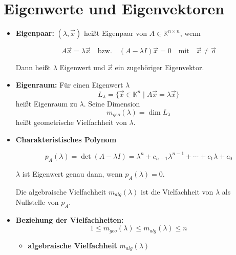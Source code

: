 \documentclass[a4paper,11pt,oneside,open=any,parskip=half, DIV=15]{scrreprt}
\begin{document}
\section{Eigenwerte und Eigenvektoren}

   \begin{itemize}
      \item \textbf{Eigenpaar:} \((\lambda, \vec{x})\) heißt Eigenpaar von \(A \in \mathbb{K}^{n \times n}\), wenn

      \begin{importantbox}
         \[
            A \vec{x} = \lambda \vec{x} \quad \text{bzw.} \quad (A - \lambda I)\vec{x} = 0 \quad \text{mit} \quad \vec x \neq \vec o
         \]
      \end{importantbox}

      Dann heißt \(\lambda\) Eigenwert und \(\vec{x}\) ein zugehöriger Eigenvektor.

      \item \textbf{Eigenraum:} Für einen Eigenwert \(\lambda\)
         \[
            L_\lambda = \{ \vec{x} \in \mathbb{K}^n \mid A \vec{x} = \lambda \vec{x}\}
         \]
      heißt Eigenraum zu \(\lambda\). Seine Dimension
         \[
            m_{geo}(\lambda) = \dim L_\lambda
         \]
      heißt geometrische Vielfachheit von \(\lambda\).

      \item \textbf{Charakteristisches Polynom}
         \begin{importantbox}
         \[  
            p_A(\lambda) = \det(A - \lambda I) = \lambda^n + c_{n-1}\lambda^{n-1} + \cdots + c_1\lambda + c_0
         \]
         \end{importantbox}

      \(\lambda\) ist Eigenwert genau dann, wenn \(p_A(\lambda) = 0\).

      Die algebraische Vielfachheit \(m_{alg}(\lambda)\) ist die Vielfachheit von \(\lambda\) als Nullstelle von \(p_A\).

      \item \textbf{Beziehung der Vielfachheiten:}
         \[
            1 \leq m_{geo}(\lambda) \leq m_{alg}(\lambda) \leq n
         \]
            
         \begin{itemize}
         
            \item \textbf{algebraische Vielfachheit} \( m_{alg}(\lambda) \)


\end{itemize}
\end{itemize}
\end{document}
